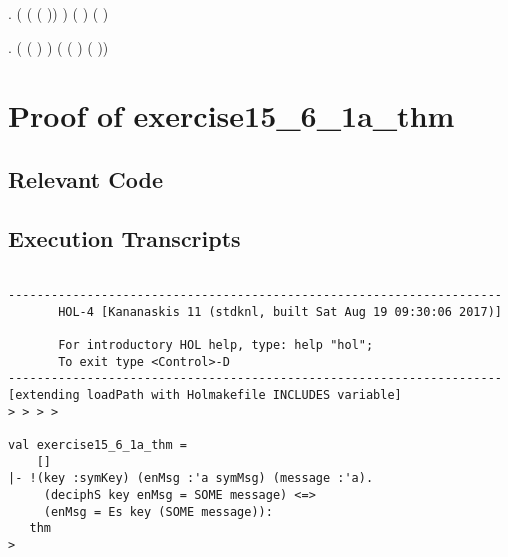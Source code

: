 \documentclass{report}
\begin{document}
\HOLTokenTurnstile{} \HOLSymConst{\HOLTokenForall{}}  .
     (  (  ( )) \HOLSymConst{=}
       ) \HOLSymConst{\HOLTokenEquiv{}}
     ( \HOLSymConst{=} ) \HOLSymConst{\HOLTokenConj{}} ( \HOLSymConst{=} )

\HOLTokenTurnstile{} \HOLSymConst{\HOLTokenForall{}} .
     ( ( )  \HOLSymConst{=}  ) \HOLSymConst{\HOLTokenEquiv{}}
     ( \HOLSymConst{=}  ( ) ( ))

\section{Proof of exercise15_6_1a_thm}
\label{sec:proof-1a}

\subsection{Relevant Code}
\label{sec:relevant-code-1a}


\subsection{Execution Transcripts}
\label{sec:exec-transcr-1a}

\setcounter{sessioncount}{0}
\begin{session}
  \begin{scriptsize}
\begin{verbatim}

---------------------------------------------------------------------
       HOL-4 [Kananaskis 11 (stdknl, built Sat Aug 19 09:30:06 2017)]

       For introductory HOL help, type: help "hol";
       To exit type <Control>-D
---------------------------------------------------------------------
[extending loadPath with Holmakefile INCLUDES variable]
> > > > 

val exercise15_6_1a_thm =
    []
|- !(key :symKey) (enMsg :'a symMsg) (message :'a).
     (deciphS key enMsg = SOME message) <=>
     (enMsg = Es key (SOME message)):
   thm
> 
 
\end{verbatim}
  \end{scriptsize}
\end{session}
\end{document}
